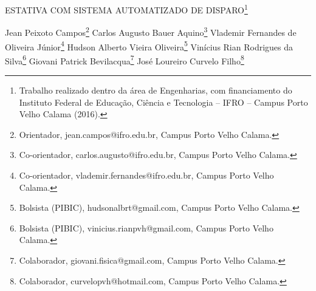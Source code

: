 \documentclass[article,12pt,onesidea,4paper,english,brazil]{abntex2}
\begin{document}
	
	
	\frenchspacing 
	
	\begin{center}
		\LARGE ESTATIVA COM SISTEMA AUTOMATIZADO DE DISPARO\footnote{Trabalho realizado dentro da área de Engenharias, com financiamento do Instituto Federal de Educação, Ciência e Tecnologia – IFRO – Campus Porto Velho Calama (2016).}
		
		\normalsize
		Jean Peixoto Campos\footnote{Orientador, jean.campos@ifro.edu.br, Campus Porto Velho Calama.} 
		Carlos Augusto Bauer Aquino\footnote{Co-orientador, carlos.augusto@ifro.edu.br, Campus Porto Velho Calama.} 
		Vlademir Fernandes de Oliveira Júnior\footnote{Co-orientador, vlademir.fernandes@ifro.edu.br, Campus Porto Velho Calama.} 
		Hudson Alberto Vieira Oliveira\footnote{Bolsista (PIBIC), hudsonalbrt@gmail.com, Campus Porto Velho Calama.}
		Vinícius Rian Rodrigues da Silva\footnote{Bolsista (PIBIC), vinicius.rianpvh@gmail.com, Campus Porto Velho Calama.}
		Giovani Patrick Bevilacqua\footnote{Colaborador, giovani.fisica@gmail.com, Campus Porto Velho Calama.}
		José Loureiro Curvelo Filho\footnote{Colaborador, curvelopvh@hotmail.com, Campus Porto Velho Calama.} 
	\end{center}
	
\end{document}
